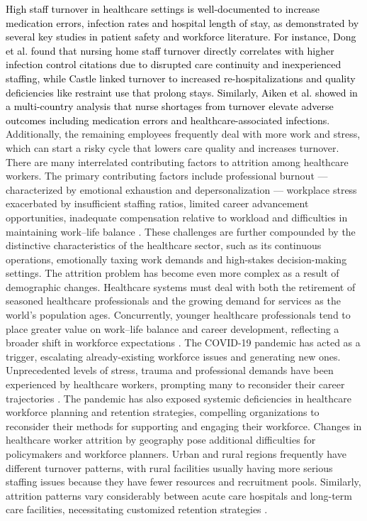 \documentclass[a4paper,fleqn]{cas-sc}
\begin{document}
\textcolor{black}{High staff turnover in healthcare settings is well-documented to increase medication errors, infection rates and hospital length of stay, as demonstrated by several key studies in patient safety and workforce literature. For instance, Dong et al. \cite{dong2022} found that nursing home staff turnover directly correlates with higher infection control citations due to disrupted care continuity and inexperienced staffing, while Castle \cite{castle2005} linked turnover to increased re-hospitalizations and quality deficiencies like restraint use that prolong stays. Similarly, Aiken et al. \cite{aiken2014} showed in a multi-country analysis that nurse shortages from turnover elevate adverse outcomes including medication errors and healthcare-associated infections}. Additionally, the remaining employees frequently deal with more work and stress, which can start a risky cycle that lowers care quality and increases turnover.
There are many interrelated contributing factors to attrition among healthcare workers. The primary contributing factors include professional burnout — characterized by emotional exhaustion and depersonalization — workplace stress exacerbated by insufficient staffing ratios, limited career advancement opportunities, inadequate compensation relative to workload and difficulties in maintaining work–life balance \cite{Maslach2016, NAM2017}. These challenges are further compounded by the distinctive characteristics of the healthcare sector, such as its continuous operations, emotionally taxing work demands and high-stakes decision-making settings.
The attrition problem has become even more complex as a result of demographic changes. Healthcare systems must deal with both the retirement of seasoned healthcare professionals and the growing demand for services as the world's population ages. Concurrently, younger healthcare professionals tend to place greater value on work–life balance and career development, reflecting a broader shift in workforce expectations \cite{LavoieTremblay2010}.
The COVID-19 pandemic has acted as a trigger, escalating already-existing workforce issues and generating new ones. Unprecedented levels of stress, trauma and professional demands have been experienced by healthcare workers, prompting many to reconsider their career trajectories \cite{Shah2020}. The pandemic has also exposed systemic deficiencies in healthcare workforce planning and retention strategies, compelling organizations to reconsider their methods for supporting and engaging their workforce.
Changes in healthcare worker attrition by geography pose additional difficulties for policymakers and workforce planners. Urban and rural regions frequently have different turnover patterns, with rural facilities usually having more serious staffing issues because they have fewer resources and recruitment pools. Similarly, attrition patterns vary considerably between acute care hospitals and long-term care facilities, necessitating customized retention strategies \cite{Kovner2014}.
\end{document}
